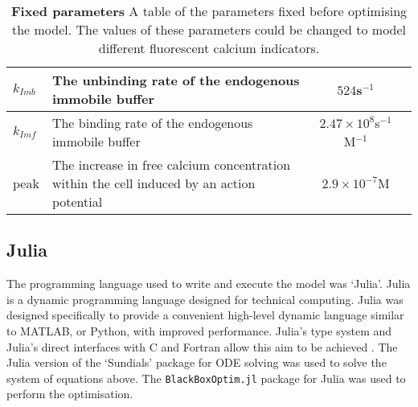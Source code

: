 \documentclass[a4paper,12pt]{article}
\theoremstyle{definition}
\begin{document}
\begin{table}
\begin{tabular}[t]{|l|p{6cm}|c|c|}
        $k_{Imb}$           & The unbinding rate of the endogenous immobile buffer                                     & $524$s$^{-1}$                         & \cite{bartol} \\ \hline
        $k_{Imf}$           & The binding rate of the endogenous immobile buffer                                       & $2.47 \times 10^{8}$s$^{-1}$M$^{-1}$  & \cite{bartol} \\ \hline
        peak                & The increase in free calcium concentration within the cell induced by an action potential & $2.9 \times 10^{-7}$M                 & \cite{maravall} \\ \hline
    \end{tabular}
    \caption{\textbf{Fixed parameters} A table of the parameters fixed before optimising the model. The values of these parameters could be changed to model different fluorescent calcium indicators.}
    \label{tab:fixed_parameters}
\end{table}

\subsection{Julia}
The programming language used to write and execute the model was `Julia'. Julia is a dynamic programming language designed for technical computing. Julia was designed specifically to provide a convenient high-level dynamic language similar to MATLAB, or Python, with improved performance. Julia's type system and Julia’s direct interfaces with C and Fortran allow this aim to be achieved \cite{bezanson}. The Julia version of the `Sundials' package for ODE solving was used to solve the system of equations above. The \texttt{BlackBoxOptim.jl} package for Julia was used to perform the optimisation.
\end{document}
